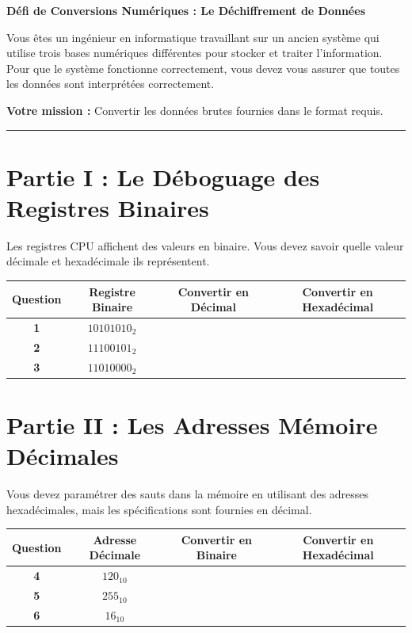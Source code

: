 
\begin{center}
\LARGE{\textbf{Défi de Conversions Numériques : Le Déchiffrement de Données}}
\end{center}


Vous êtes un ingénieur en informatique travaillant sur un ancien système qui utilise trois bases numériques différentes pour stocker et traiter l'information. Pour que le système fonctionne correctement, vous devez vous assurer que toutes les données sont interprétées correctement.

\textbf{Votre mission :} Convertir les données brutes fournies dans le format requis.

\vspace{0.3cm}
\hrule
\vspace{0.3cm}

\section*{Partie I : Le Déboguage des Registres Binaires}

Les registres CPU affichent des valeurs en binaire. Vous devez savoir quelle valeur décimale et hexadécimale ils représentent.

\begin{center}
\begin{tabular}{|c|c|c|c|}
    \hline
    \textbf{Question} & \textbf{Registre Binaire} & \textbf{Convertir en Décimal } & \textbf{Convertir en Hexadécimal } \\
    \hline
    \textbf{1} & $10101010_2$ & & \\
    \hline
    \textbf{2} & $11100101_2$ & & \\
    \hline
    \textbf{3} & $11010000_2$ & & \\
    \hline
\end{tabular}
\end{center}

\vspace{0.5cm}

\section*{Partie II : Les Adresses Mémoire Décimales}

Vous devez paramétrer des sauts dans la mémoire en utilisant des adresses hexadécimales, mais les spécifications sont fournies en décimal.

\begin{center}
\begin{tabular}{|c|c|c|c|}
    \hline
    \textbf{Question} & \textbf{Adresse Décimale } & \textbf{Convertir en Binaire} & \textbf{Convertir en Hexadécimal} \\
    \hline
    \textbf{4} & $120_{10}$ & & \\
    \hline
    \textbf{5} & $255_{10}$ & & \\
    \hline
    \textbf{6} & $16_{10}$ & & \\
    \hline
\end{tabular}
\end{center}

